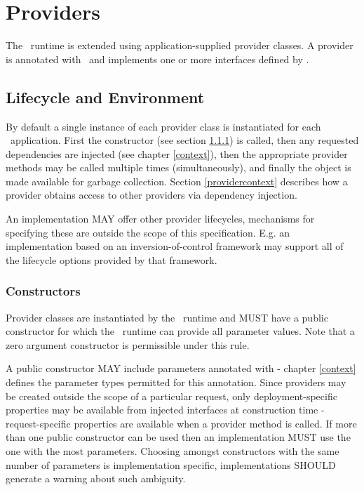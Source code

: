\chapter{Providers}
\label{providers}

The \jaxrs\ runtime is extended using application-supplied provider classes. A provider is annotated with \Provider\ and implements one or more interfaces defined by \jaxrs.

\section{Lifecycle and Environment}

By default a single instance of each provider class is instantiated for each \jaxrs\ application. First the constructor (see section \ref{provider_class_constructor}) is called, then any requested dependencies are injected (see chapter \ref{context}), then the appropriate provider methods may be called multiple times (simultaneously), and finally the object is made available for garbage collection. Section \ref{providercontext} describes how a provider obtains access to other providers via dependency injection.

An implementation MAY offer other provider lifecycles, mechanisms for specifying these are outside the scope of this specification. E.g. an implementation based on an inversion-of-control framework may support all of the lifecycle options provided by that framework.

\subsection{Constructors}
\label{provider_class_constructor}

Provider classes are instantiated by the \jaxrs\ runtime and MUST have a public constructor for which the \jaxrs\ runtime can provide all parameter values. Note that a zero argument constructor is permissible under this rule.

A public constructor MAY include parameters annotated with \Context - chapter \ref{context} defines the parameter types permitted for this annotation. Since providers may be created outside the scope of a particular request, only deployment-specific properties may be available from injected interfaces at construction time - request-specific properties are available when a provider method is called. If more than one public constructor can be used then an implementation MUST use the one with the most parameters. Choosing amongst constructors with the same number of parameters is implementation specific, implementations SHOULD generate a warning about such ambiguity.


